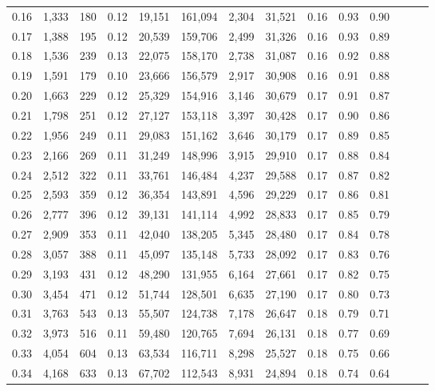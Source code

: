 \begin{tabular}{rrrrrrrrrrrrrr}
0.16 &  1,333 &  180 &  0.12 &   19,151 &  161,094 &   2,304 &  31,521 &  0.16 &  0.93 &      0.90 \\
0.17 &  1,388 &  195 &  0.12 &   20,539 &  159,706 &   2,499 &  31,326 &  0.16 &  0.93 &      0.89 \\
0.18 &  1,536 &  239 &  0.13 &   22,075 &  158,170 &   2,738 &  31,087 &  0.16 &  0.92 &      0.88 \\
0.19 &  1,591 &  179 &  0.10 &   23,666 &  156,579 &   2,917 &  30,908 &  0.16 &  0.91 &      0.88 \\
0.20 &  1,663 &  229 &  0.12 &   25,329 &  154,916 &   3,146 &  30,679 &  0.17 &  0.91 &      0.87 \\
0.21 &  1,798 &  251 &  0.12 &   27,127 &  153,118 &   3,397 &  30,428 &  0.17 &  0.90 &      0.86 \\
0.22 &  1,956 &  249 &  0.11 &   29,083 &  151,162 &   3,646 &  30,179 &  0.17 &  0.89 &      0.85 \\
0.23 &  2,166 &  269 &  0.11 &   31,249 &  148,996 &   3,915 &  29,910 &  0.17 &  0.88 &      0.84 \\
0.24 &  2,512 &  322 &  0.11 &   33,761 &  146,484 &   4,237 &  29,588 &  0.17 &  0.87 &      0.82 \\
0.25 &  2,593 &  359 &  0.12 &   36,354 &  143,891 &   4,596 &  29,229 &  0.17 &  0.86 &      0.81 \\
0.26 &  2,777 &  396 &  0.12 &   39,131 &  141,114 &   4,992 &  28,833 &  0.17 &  0.85 &      0.79 \\
0.27 &  2,909 &  353 &  0.11 &   42,040 &  138,205 &   5,345 &  28,480 &  0.17 &  0.84 &      0.78 \\
0.28 &  3,057 &  388 &  0.11 &   45,097 &  135,148 &   5,733 &  28,092 &  0.17 &  0.83 &      0.76 \\
0.29 &  3,193 &  431 &  0.12 &   48,290 &  131,955 &   6,164 &  27,661 &  0.17 &  0.82 &      0.75 \\
0.30 &  3,454 &  471 &  0.12 &   51,744 &  128,501 &   6,635 &  27,190 &  0.17 &  0.80 &      0.73 \\
0.31 &  3,763 &  543 &  0.13 &   55,507 &  124,738 &   7,178 &  26,647 &  0.18 &  0.79 &      0.71 \\
0.32 &  3,973 &  516 &  0.11 &   59,480 &  120,765 &   7,694 &  26,131 &  0.18 &  0.77 &      0.69 \\
0.33 &  4,054 &  604 &  0.13 &   63,534 &  116,711 &   8,298 &  25,527 &  0.18 &  0.75 &      0.66 \\
0.34 &  4,168 &  633 &  0.13 &   67,702 &  112,543 &   8,931 &  24,894 &  0.18 &  0.74 &      0.64 \\

\end{tabular}
